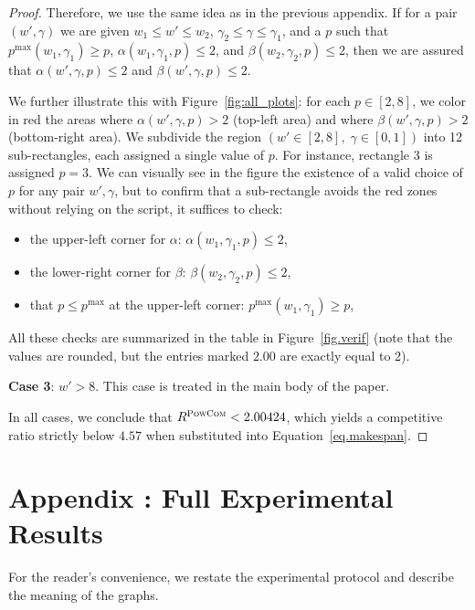 \documentclass{article}
\newcommand\PCOM{\textsc{PowCom}\xspace}
\begin{document}
\begin{proof}
Therefore, we use the same idea as in the previous appendix. If for a pair $(w',\gamma)$ we are given $w_1 \leq w' \leq w_2$, $\gamma_2 \leq \gamma \leq \gamma_1$, and a $p$ such that $p^{\max}(w_1,\gamma_1) \geq p$, $\alpha(w_1,\gamma_1,p) \leq 2$, and $\beta(w_2,\gamma_2,p) \leq 2$, then we are assured that $\alpha(w',\gamma,p) \leq 2$ and $\beta(w',\gamma,p) \leq 2$.

We further illustrate this with Figure~\ref{fig:all_plots}: for each $p \in [2,8]$, we color in red the areas where $\alpha(w',\gamma,p) > 2$ (top-left area) and where $\beta(w',\gamma,p) > 2$ (bottom-right area). We subdivide the region $(w' \in [2,8],\; \gamma \in [0,1])$ into 12 sub-rectangles, each assigned a single value of $p$. For instance, rectangle 3 is assigned $p = 3$. We can visually see in the figure the existence of a valid choice of $p$ for any pair $w', \gamma$, but to confirm that a sub-rectangle avoids the red zones without relying on the
script, it suffices to check:
\begin{itemize}
    \item the upper-left corner for $\alpha$: $\alpha(w_1, \gamma_1, p) \leq 2$,
    \item the lower-right corner for $\beta$: $\beta(w_2, \gamma_2, p) \leq 2$,
    \item that $p \leq p^{\max}$ at the upper-left corner: $p^{\max}(w_1, \gamma_1) \geq p$,
\end{itemize}

All these checks are summarized in the table in Figure~\ref{fig.verif} (note that the values are rounded, but the entries marked $2.00$ are exactly equal to 2).

\textbf{Case 3}: $w' > 8$.  
This case is treated in the main body of the paper.

\smallskip
\noindent
In all cases, we conclude that \(R^{\PCOM}<2.00424\), which yields a competitive ratio strictly below \(4.57\) when substituted into Equation~\ref{eq.makespan}.
\end{proof}


\FloatBarrier 
\newpage
\section{Appendix : Full Experimental Results}
\label{ap.experiments}

For the reader's convenience, we restate the experimental protocol and describe the meaning of the graphs.
\end{document}
